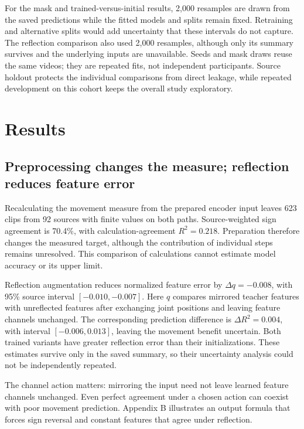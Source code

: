 \documentclass{article}
\begin{document}
For the mask and trained-versus-initial results, 2,000 resamples are drawn from the saved predictions while the fitted models and splits remain fixed. Retraining and alternative splits would add uncertainty that these intervals do not capture. The reflection comparison also used 2,000 resamples, although only its summary survives and the underlying inputs are unavailable. Seeds and mask draws reuse the same videos; they are repeated fits, not independent participants. Source holdout protects the individual comparisons from direct leakage, while repeated development on this cohort keeps the overall study exploratory.

\section{Results}\label{results}

\subsection{Preprocessing changes the measure; reflection reduces feature error}\label{preprocessing-changes-the-measure-reflection-reduces-feature-error}

Recalculating the movement measure from the prepared encoder input leaves 623 clips from 92 sources with finite values on both paths. Source-weighted sign agreement is 70.4\%, with calculation-agreement \(R^2=0.218\). Preparation therefore changes the measured target, although the contribution of individual steps remains unresolved. This comparison of calculations cannot estimate model accuracy or its upper limit.

Reflection augmentation reduces normalized feature error by \(\Delta q=-0.008\), with 95\% source interval \([-0.010,-0.007]\). Here \(q\) compares mirrored teacher features with unreflected features after exchanging joint positions and leaving feature channels unchanged. The corresponding prediction difference is \(\Delta R^2=0.004\), with interval \([-0.006,0.013]\), leaving the movement benefit uncertain. Both trained variants have greater reflection error than their initializations. These estimates survive only in the saved summary, so their uncertainty analysis could not be independently repeated.

The channel action matters: mirroring the input need not leave learned feature channels unchanged. Even perfect agreement under a chosen action can coexist with poor movement prediction. Appendix B illustrates an output formula that forces sign reversal and constant features that agree under reflection.
\end{document}
